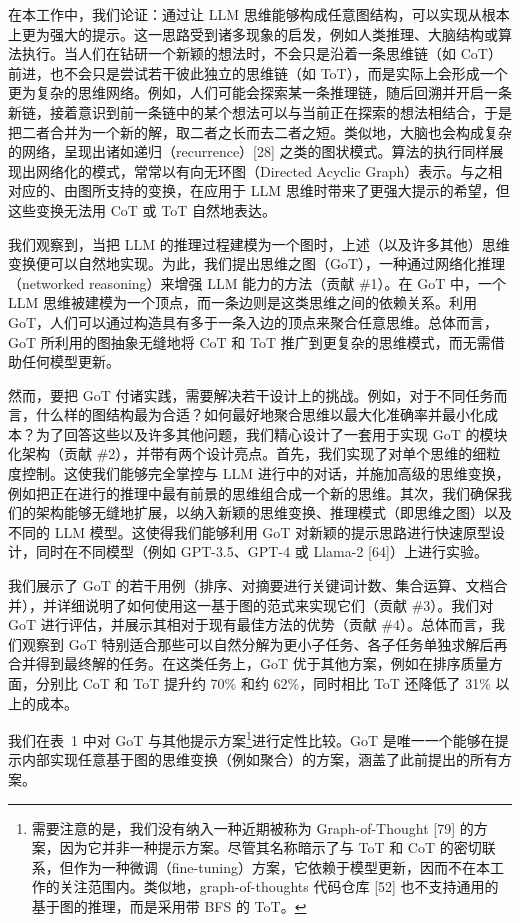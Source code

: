 \documentclass[11pt,UTF8,fontset=fandol]{ctexart}
\begin{document}
在本工作中，我们论证：通过让 LLM 思维能够构成任意图结构，可以实现从根本上更为强大的提示。这一思路受到诸多现象的启发，例如人类推理、大脑结构或算法执行。当人们在钻研一个新颖的想法时，不会只是沿着一条思维链（如 CoT）前进，也不会只是尝试若干彼此独立的思维链（如 ToT），而是实际上会形成一个更为复杂的思维网络。例如，人们可能会探索某一条推理链，随后回溯并开启一条新链，接着意识到前一条链中的某个想法可以与当前正在探索的想法相结合，于是把二者合并为一个新的解，取二者之长而去二者之短。类似地，大脑也会构成复杂的网络，呈现出诸如递归（recurrence）[28] 之类的图状模式。算法的执行同样展现出网络化的模式，常常以有向无环图（Directed Acyclic Graph）表示。与之相对应的、由图所支持的变换，在应用于 LLM 思维时带来了更强大提示的希望，但这些变换无法用 CoT 或 ToT 自然地表达。

我们观察到，当把 LLM 的推理过程建模为一个图时，上述（以及许多其他）思维变换便可以自然地实现。为此，我们提出思维之图（GoT），一种通过网络化推理（networked reasoning）来增强 LLM 能力的方法（贡献 \#1）。在 GoT 中，一个 LLM 思维被建模为一个顶点，而一条边则是这类思维之间的依赖关系。利用 GoT，人们可以通过构造具有多于一条入边的顶点来聚合任意思维。总体而言，GoT 所利用的图抽象无缝地将 CoT 和 ToT 推广到更复杂的思维模式，而无需借助任何模型更新。

然而，要把 GoT 付诸实践，需要解决若干设计上的挑战。例如，对于不同任务而言，什么样的图结构最为合适？如何最好地聚合思维以最大化准确率并最小化成本？为了回答这些以及许多其他问题，我们精心设计了一套用于实现 GoT 的模块化架构（贡献 \#2），并带有两个设计亮点。首先，我们实现了对单个思维的细粒度控制。这使我们能够完全掌控与 LLM 进行中的对话，并施加高级的思维变换，例如把正在进行的推理中最有前景的思维组合成一个新的思维。其次，我们确保我们的架构能够无缝地扩展，以纳入新颖的思维变换、推理模式（即思维之图）以及不同的 LLM 模型。这使得我们能够利用 GoT 对新颖的提示思路进行快速原型设计，同时在不同模型（例如 GPT-3.5、GPT-4 或 Llama-2 [64]）上进行实验。

我们展示了 GoT 的若干用例（排序、对摘要进行关键词计数、集合运算、文档合并），并详细说明了如何使用这一基于图的范式来实现它们（贡献 \#3）。我们对 GoT 进行评估，并展示其相对于现有最佳方法的优势（贡献 \#4）。总体而言，我们观察到 GoT 特别适合那些可以自然分解为更小子任务、各子任务单独求解后再合并得到最终解的任务。在这类任务上，GoT 优于其他方案，例如在排序质量方面，分别比 CoT 和 ToT 提升约 70\% 和约 62\%，同时相比 ToT 还降低了 31\% 以上的成本。

我们在表~1 中对 GoT 与其他提示方案\footnote{需要注意的是，我们没有纳入一种近期被称为 Graph-of-Thought [79] 的方案，因为它并非一种提示方案。尽管其名称暗示了与 ToT 和 CoT 的密切联系，但作为一种微调（fine-tuning）方案，它依赖于模型更新，因而不在本工作的关注范围内。类似地，graph-of-thoughts 代码仓库 [52] 也不支持通用的基于图的推理，而是采用带 BFS 的 ToT。}进行定性比较。GoT 是唯一一个能够在提示内部实现任意基于图的思维变换（例如聚合）的方案，涵盖了此前提出的所有方案。
\end{document}

